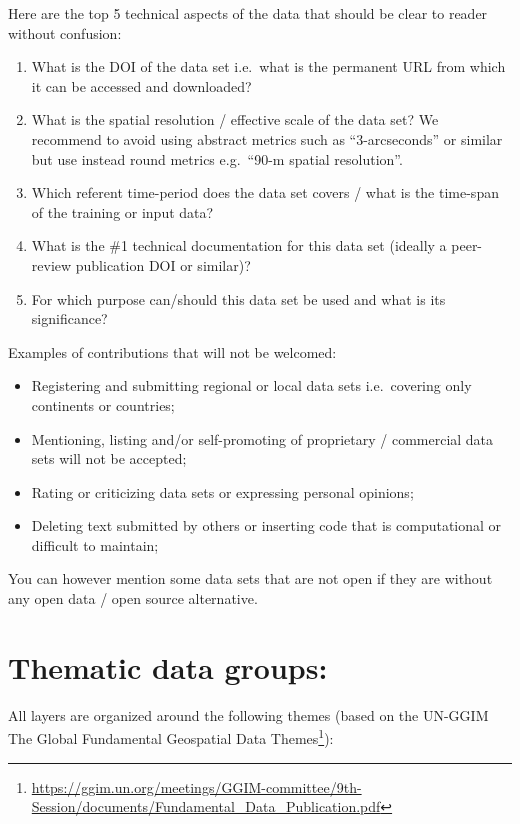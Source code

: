 \documentclass[
  graybox,natbib,nospthms]{svmono}
\providecommand{\tightlist}{%
  \setlength{\itemsep}{0pt}\setlength{\parskip}{0pt}}
\providecommand{\tightlist}{\setlength{\itemsep}{0pt}\setlength{\parskip}{0pt}}
\renewcommand{\href}[2]{#2 (\url{#1})}
\renewcommand{\href}[2]{#2\footnote{\url{#1}}}
\begin{document}
Here are the top 5 technical aspects of the data that should be clear to reader without confusion:

\begin{enumerate}
\def\labelenumi{\arabic{enumi}.}
\tightlist
\item
  What is the DOI of the data set i.e.~what is the permanent URL from which it can be accessed and downloaded?
\item
  What is the spatial resolution / effective scale of the data set? We recommend to avoid using abstract metrics such as ``3-arcseconds'' or similar but use instead round metrics e.g.~``90-m spatial resolution''.
\item
  Which referent time-period does the data set covers / what is the time-span of the training or input data?
\item
  What is the \#1 technical documentation for this data set (ideally a peer-review publication DOI or similar)?
\item
  For which purpose can/should this data set be used and what is its significance?
\end{enumerate}

Examples of contributions that will not be welcomed:

\begin{itemize}
\tightlist
\item
  Registering and submitting regional or local data sets i.e.~covering only continents or countries;
\item
  Mentioning, listing and/or self-promoting of proprietary / commercial data sets will not be accepted;
\item
  Rating or criticizing data sets or expressing personal opinions;
\item
  Deleting text submitted by others or inserting code that is computational or difficult to maintain;
\end{itemize}

You can however mention some data sets that are not open if they are without any open data / open source alternative.

\hypertarget{thematic-data-groups}{%
\section{Thematic data groups:}\label{thematic-data-groups}}

All layers are organized around the following themes
(based on the \href{https://ggim.un.org/meetings/GGIM-committee/9th-Session/documents/Fundamental_Data_Publication.pdf}{UN-GGIM The Global Fundamental Geospatial Data Themes}):
\end{document}
